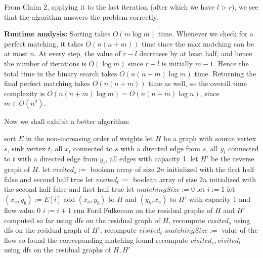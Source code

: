 \documentclass[answers]{exam}
\begin{document}
\begin{questions}
\begin{solution}
    From Claim 2, applying it to the last iteration (after which we have $l > r$), we see that the algorithm answers the problem correctly.

    \textbf{Runtime analysis:}
    Sorting takes $O(m \log m)$ time. Whenever we check for a perfect matching, it takes $O(n(n + m))$ time since the max matching can be at most $n$. At every step, the value of $r - l$ decreases by at least half, and hence the
    number of iterations is $O(\log m)$ since $r - l$ is initially $m - 1$. Hence the total time in the binary search takes $O(n(n + m) \log m)$ time. Returning the final perfect matching takes
    $O(n(n + m))$ time
    as well, so the overall time complexity is $O(n(n + m) \log m) = O(n(n + m) \log n)$, since $m \in O(n^2)$.
\end{solution}

\begin{solution}

    Now we shall exhibit a better algorithm:

    \begin{algorithmic}
            \State sort $E$ in the non-increasing order of weights
            \State let $H$ be a graph with source vertex $s$, sink vertex $t$, all $x_i$ connected to $s$ with a directed edge from $s$, all $y_i$ connected to $t$ with a directed edge from $y_i$,
            all edges with capacity 1.
            \State let $H'$ be the reverse graph of $H$.
            \State let $visited_s := $ boolean array of size $2n$ initialized with the first half false and second half true
            \State let $visited_t := $ boolean array of size $2n$ initialized with the second half false and first half true
            \State let $matchingSize := 0$
            \State let $i := 1$
                \State let $(x_a, y_b) := E[i]$
                \State add $(x_a, y_b)$ to $H$ and $(y_b, x_a)$ to $H'$ with capacity 1 and flow value 0
                \State $i := i + 1$
                    \State run Ford Fulkerson on the residual graphs of $H$ and $H'$ computed so far
                    \State using dfs on the residual graph of $H$, recompute $visited_s$
                    \State using dfs on the residual graph of $H'$, recompute $visited_t$
                    \State $matchingSize := $ value of the flow so found
                        \State \Return the corresponding matching found
                    \EndIf
                \Else
                    \State recompute $visited_s, visited_t$ using dfs on the residual graphs of $H, H'$
                \EndIf
            \EndWhile
        \EndFunction
    \end{algorithmic}


\end{solution}
\end{questions}
\end{document}
